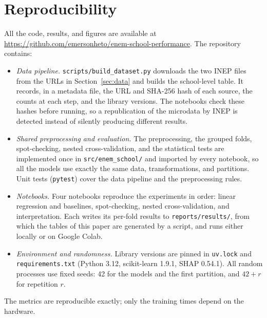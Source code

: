 \section{Reproducibility}
\label{sec:reproducibility}

All the code, results, and figures are available at
\url{https://github.com/emersonheto/enem-school-performance}. The repository contains:
\begin{itemize}
  \item \emph{Data pipeline.} \texttt{scripts/build\_dataset.py} downloads the two INEP files from
        the URLs in Section~\ref{sec:data} and builds the school-level table. It records, in a
        metadata file, the URL and SHA-256 hash of each source, the counts at each step, and the
        library versions. The notebooks check these hashes before running, so a republication of
        the microdata by INEP is detected instead of silently producing different results.
  \item \emph{Shared preprocessing and evaluation.} The preprocessing, the grouped folds,
        spot-checking, nested cross-validation, and the statistical tests are implemented once in
        \texttt{src/enem\_school/} and imported by every notebook, so all the models use exactly
        the same data, transformations, and partitions. Unit tests (\texttt{pytest}) cover the
        data pipeline and the preprocessing rules.
  \item \emph{Notebooks.} Four notebooks reproduce the experiments in order: linear regression and
        baselines, spot-checking, nested cross-validation, and interpretation. Each writes its
        per-fold results to \texttt{reports/results/}, from which the tables of this paper are
        generated by a script, and runs either locally or on Google Colab.
  \item \emph{Environment and randomness.} Library versions are pinned in \texttt{uv.lock} and
        \texttt{requirements.txt} (Python 3.12, scikit-learn 1.9.1, SHAP 0.54.1). All random
        processes use fixed seeds: 42 for the models and the first partition, and $42 + r$ for
        repetition $r$.
\end{itemize}
The metrics are reproducible exactly; only the training times depend on the hardware.
